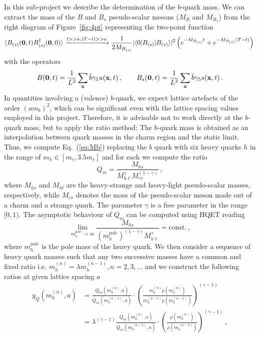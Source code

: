 In this sub-project we describe the determination of the $b$-quark
mass. We can extract the mass of the $B$ and $B_s$ pseudo-scalar mesons ($M_{B}$ and $M_{B_s}$)
from the right diagram of Figure~\ref{fig:4pt} representing the two-point function
\begin{equation}
  \langle B_{(s)}(\bm{0},t) B_{(s)}^\dagger({\bf 0},0)\rangle\xrightarrow{t>>a, (T-t)>>a}
  \frac{1}{2M_{B_{(s)}}}|\langle 0 | B_{(s)} | B_{(s)}\rangle|^2\left(e^{-M_{B_{(s)}} t}+e^{-M_{B_{(s)}}(T-t)}\right)
  \,
  \label{eq:Mb}
\end{equation}
with the operators
\[
B({\bf 0},t)=\frac{1}{L^3}\sum_{\bf x}\bar b\gamma_5 u({\bf x},t)\,,\qquad
B_s({\bf 0},t)=\frac{1}{L^3}\sum_{\bf x}\bar b\gamma_5 s({\bf x},t)\,.
\]
In quantities involving a (valence) $b$-quark, we expect lattice
artefacts of the order $(am_b)^2$, which can be significant even with
the lattice spacing values employed in this project. Therefore, it is
advisable not to work directly at the $b$-quark mass, but to apply the
ratio method: The $b$-quark mass is obtained as an interpolation
between quark masses in the charm region and the static limit.
Thus, we compute Eq.~(\ref{eq:Mb}) replacing the $b$ quark with six heavy quarks $h$
in the range of $m_h\in [m_c,3.5m_c]$
and for each we compute the ratio
\begin{equation}
  Q_m = \frac{M_{hs}}{M_{h\ell}^\gamma M_{cs}^{(1-\gamma)}}\,,
  \label{eq:ratio_Q}
\end{equation}
where $M_{hs}$ and $M_{hl}$ are the heavy-strange and heavy-light
pseudo-scalar masses, respectively, while $M_{cs}$ denotes
the mass of the pseudo-scalar meson made out of a charm
and a strange quark. The parameter $\gamma$ is a free parameter in the range $[0, 1)$.
The asymptotic behaviour of $Q_m$ can be computed using HQET reading
\begin{equation}
  \lim_{ m^{pole}_h\to \infty}
  \frac{M_{hs}}{( m^{pole}_h)^{(1-\gamma)} M_{h\ell}^\gamma}=\mbox{const.}\,,
  \label{eq:yHQFTlim}
\end{equation}
where $ m^{pole}_h$ is the pole mass of the heavy quark.
We then consider a sequence of heavy quark masses such that any two
successive masses have a common and fixed ratio i.e.
$ m_h^{(n)}=\lambda m_h^{(n-1)}, n=2,3,...$ and we construct the
following ratios at given lattice spacing $a$
\begin{equation}
  \begin{split}
    y_Q( m^{(n)}_h,a)&=\frac{Q_m( m_h^{(n)},a)}{Q_m( m_h^{(n-1)},a)}\cdot
    \left(\frac{ m_{h}^{(n)} \rho( m_{h}^{(n)})}{ m_{h}^{(n-1)}\rho( m_{h}^{(n-1)})}\right)^{(\gamma-1)}\\
    &=\lambda^{(\gamma-1)}\frac{Q_m( m_h^{(n)},a)}{Q_m( m_h^{(n-1)},a)}\cdot
    \left(\frac{ \rho( m_{h}^{(n)})}{\rho(
      m_{h}^{(n-1)})}\right)^{(\gamma-1)}\,,
  \end{split}
\end{equation}

